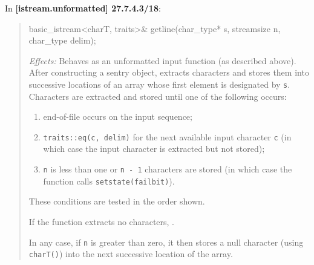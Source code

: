 \documentclass{wg21}
\begin{document}
In \textbf{[istream.unformatted] 27.7.4.3/18}:
\begin{quote}
\begin{codeblock}
basic_istream<charT, traits>& getline(char_type* s, streamsize n, char_type delim);
\end{codeblock}
\textit{Effects:} Behaves as an unformatted input function (as described above).
After constructing a sentry object, extracts characters and stores them into
successive locations of an array whose first element is designated by \texttt{s}.
Characters are extracted and stored until one of the following occurs:
\begin{enumerate}
  \item end-of-file occurs on the input sequence;
  \item \texttt{traits::eq(c, delim)} for the next available input character
        \texttt{c} (in which case the input character is extracted but not stored);
  \item \texttt{n} is less than one or \texttt{n - 1} characters are stored
        (in which case the function calls \texttt{setstate(failbit)}).
\end{enumerate}

These conditions are tested in the order shown.

If the function extracts no characters, .

In any case, if \texttt{n} is greater than zero, it then stores a null character
(using \texttt{charT()}) into the next successive location of the array.
\end{quote}
\end{document}

